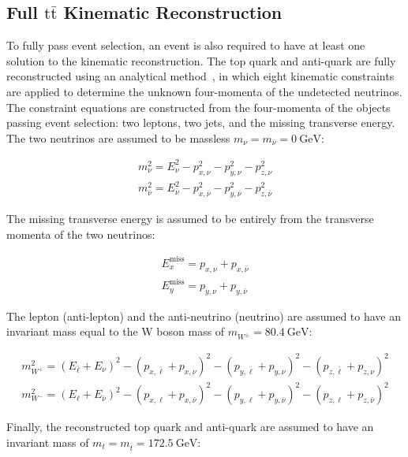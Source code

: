 \subsection{Full \ensuremath{\mathrm{t\bar{t}}} Kinematic Reconstruction}
To fully pass event selection, an event is also required to have at least one solution to the \ttbar kinematic reconstruction.
The top quark and anti-quark are fully reconstructed using an analytical method~\cite{Sonnenschein:2006ud}, in which eight kinematic constraints are applied to determine the unknown four-momenta of the undetected neutrinos.
The constraint equations are constructed from the four-momenta of the objects passing event selection: two leptons, two jets, and the missing transverse energy. 
The two neutrinos are assumed to be massless $m_{\nu} = m_{\bar{\nu}} = \SI{0}{\GeV}$:
\begin{linenomath*}
\begin{align}
m_{\nu}^2 = E_{\nu}^2 - p_{x, \nu}^2 - p_{y, \nu}^2 - p_{z, \nu}^2 \\
m_{\bar{\nu}}^2 = E_{\bar{\nu}}^2 - p_{x, \bar{\nu}}^2 - p_{y, \bar{\nu}}^2 - p_{z, \bar{\nu}}^2 
\end{align}
\end{linenomath*}
The missing transverse energy is assumed to be entirely from the transverse momenta of the two neutrinos:
\begin{linenomath*}
\begin{align}
E_{x}^{\text{miss}}=p_{x, \nu}+p_{x, \bar{\nu}} \\
E_{y}^{\text{miss}}=p_{y, \nu}+p_{y, \bar{\nu}}
\end{align}
\end{linenomath*}
The lepton (anti-lepton) and the anti-neutrino (neutrino) are assumed to have an invariant mass equal to the W boson mass of $m_{W^\pm} = \SI{80.4}{\GeV}$:
\begin{linenomath*}
\begin{align}
m_{W^{+}}^2 =\left(E_{\bar{\ell}}+E_\nu\right)^2-\left(p_{x, \bar{\ell}}+p_{x, \nu}\right)^2  -\left(p_{y, \bar{\ell}}+p_{y, \nu}\right)^2-\left(p_{z, \bar{\ell}}+p_{z, \nu}\right)^2 \\
m_{W^{-}}^2 =\left(E_{\ell}+E_{\bar{\nu}}\right)^2-\left(p_{x, \ell}+p_{x, \bar{\nu}}\right)^2 -\left(p_{y, \ell}+p_{y, \bar{\nu}}\right)^2-\left(p_{z, \ell}+p_{z, \bar{\nu}}\right)^2
\end{align}
\end{linenomath*}
Finally, the reconstructed top quark and anti-quark are assumed to have an invariant mass of $m_{t} = m_{\bar{t}} = \SI{172.5}{\GeV}$:
